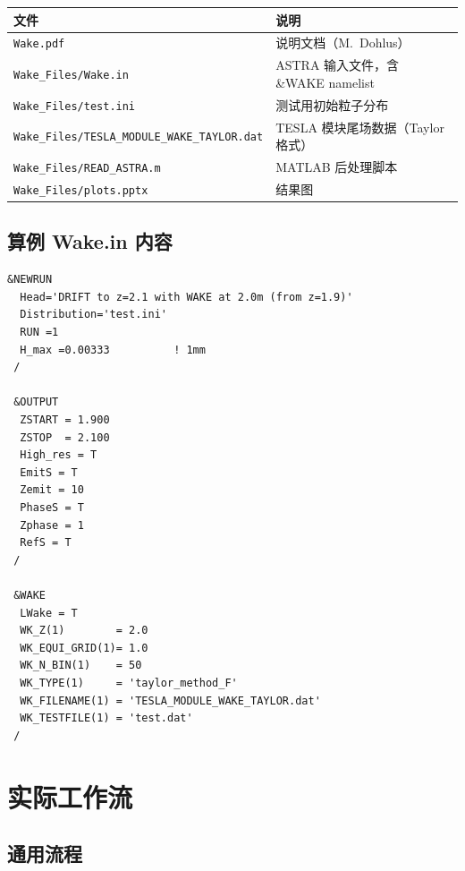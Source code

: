 \documentclass[a4paper,11pt]{article}
\begin{document}
\begin{center}
\begin{tabular}{ll}
\toprule
\textbf{文件} & \textbf{说明} \\
\midrule
\texttt{Wake.pdf} & 说明文档（M.~Dohlus） \\
\texttt{Wake\_Files/Wake.in} & ASTRA 输入文件，含 \&WAKE namelist \\
\texttt{Wake\_Files/test.ini} & 测试用初始粒子分布 \\
\texttt{Wake\_Files/TESLA\_MODULE\_WAKE\_TAYLOR.dat} & TESLA 模块尾场数据（Taylor 格式） \\
\texttt{Wake\_Files/READ\_ASTRA.m} & MATLAB 后处理脚本 \\
\texttt{Wake\_Files/plots.pptx} & 结果图 \\
\bottomrule
\end{tabular}
\end{center}

\subsection{算例 Wake.in 内容}

\begin{lstlisting}[gobble=4]
 &NEWRUN
  Head='DRIFT to z=2.1 with WAKE at 2.0m (from z=1.9)'
  Distribution='test.ini'
  RUN =1
  H_max =0.00333          ! 1mm
 /

 &OUTPUT
  ZSTART = 1.900
  ZSTOP  = 2.100
  High_res = T
  EmitS = T
  Zemit = 10
  PhaseS = T
  Zphase = 1
  RefS = T
 /

 &WAKE
  LWake = T
  WK_Z(1)        = 2.0
  WK_EQUI_GRID(1)= 1.0
  WK_N_BIN(1)    = 50
  WK_TYPE(1)     = 'taylor_method_F'
  WK_FILENAME(1) = 'TESLA_MODULE_WAKE_TAYLOR.dat'
  WK_TESTFILE(1) = 'test.dat'
 /
\end{lstlisting}

\newpage
\section{实际工作流}

\subsection{通用流程}
\end{document}
